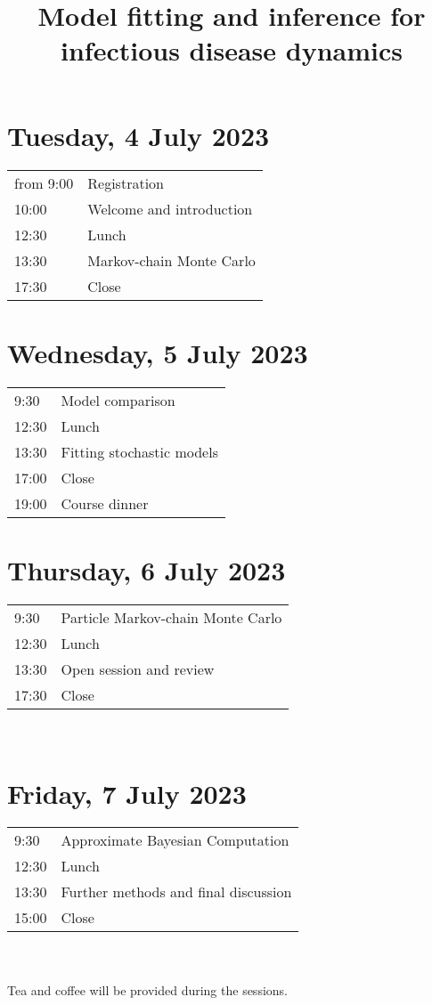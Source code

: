 \documentclass[a4paper]{article}
\title{Model fitting and inference for\\infectious disease dynamics}
\author{}
\date{}
\begin{document}
\maketitle

\section*{Tuesday, 4 July 2023}
\label{sec:tuesday}

\begin{tabular}{R{1.5cm} l}
from 9:00 & Registration\\
10:00 & Welcome and introduction\\
12:30 & Lunch\\
13:30 & Markov-chain Monte Carlo\\
17:30 & Close\\
\end{tabular}

\section*{Wednesday, 5 July 2023}
\label{sec:wednesday}
\begin{tabular}{R{1.5cm} l}
9:30 & Model comparison\\
12:30 & Lunch\\
13:30 & Fitting stochastic models\\
17:00 & Close\\
19:00 & Course dinner
\end{tabular}

\section*{Thursday, 6 July 2023}
\label{sec:thursday}
\begin{tabular}{R{1.5cm} l}
9:30 & Particle Markov-chain Monte Carlo\\
12:30 & Lunch\\
13:30 & Open session and review\\
17:30 & Close\\
\end{tabular}\\

\section*{Friday, 7 July 2023}
\label{sec:thursday}
\begin{tabular}{R{1.5cm} l}
9:30 & Approximate Bayesian Computation\\
12:30 & Lunch\\
13:30 & Further methods and final discussion\\
15:00 & Close\\
\end{tabular}\\
\vspace{0.5cm}\\
Tea and coffee will be provided during the sessions.
\end{document}
